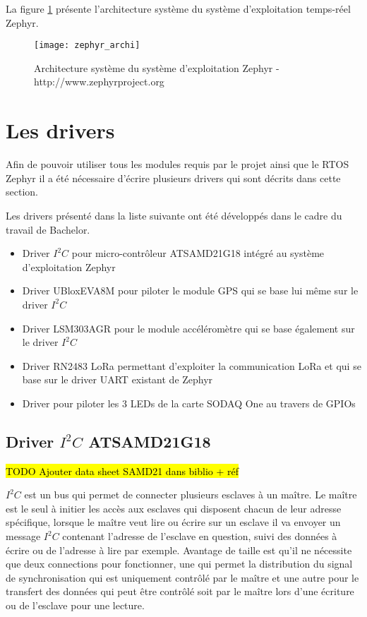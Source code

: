 La figure \ref{fig:zephyr_archi} présente l'architecture système du système d'exploitation temps-réel Zephyr.

\begin{figure}[htb]
\centering 
\texttt{[image: zephyr\_archi]} 
\caption{Architecture système du système d'exploitation Zephyr - http://www.zephyrproject.org}
\label{fig:zephyr_archi}
\end{figure}

\section{Les drivers}\label{ch:drivers}

Afin de pouvoir utiliser tous les modules requis par le projet ainsi que le RTOS Zephyr il a été nécessaire d'écrire plusieurs drivers qui sont décrits dans cette section.

Les drivers présenté dans la liste suivante ont été développés dans le cadre du travail de Bachelor.

\begin{itemize}
\item Driver $I^{2}C$ pour micro-contrôleur ATSAMD21G18 intégré au système d'exploitation Zephyr
\item Driver UBloxEVA8M pour piloter le module GPS qui se base lui même sur le driver $I^{2}C$
\item Driver LSM303AGR pour le module accéléromètre qui se base également sur le driver  $I^{2}C$
\item Driver RN2483 LoRa permettant d'exploiter la communication LoRa et qui se base sur le driver UART existant de Zephyr
\item Driver pour piloter les 3 LEDs de la carte SODAQ One au travers de GPIOs
\end{itemize}

\subsection{Driver $I^{2}C$ ATSAMD21G18}

\hl{TODO Ajouter data sheet SAMD21 dans biblio + réf}

$I^{2}C$ est un bus qui permet de connecter plusieurs esclaves à un maître. Le maître est le seul à initier les accès aux esclaves qui disposent chacun de leur adresse spécifique, lorsque le maître veut lire ou écrire sur un esclave il va envoyer un message $I^{2}C$ contenant l'adresse de l'esclave en question, suivi des données à écrire ou de l'adresse à lire par exemple. Avantage de taille est qu'il ne nécessite que deux connections pour fonctionner, une qui permet la distribution du signal de synchronisation qui est uniquement contrôlé par le maître et une autre pour le transfert des données qui peut être contrôlé soit par le maître lors d'une écriture ou de l'esclave pour une lecture.

